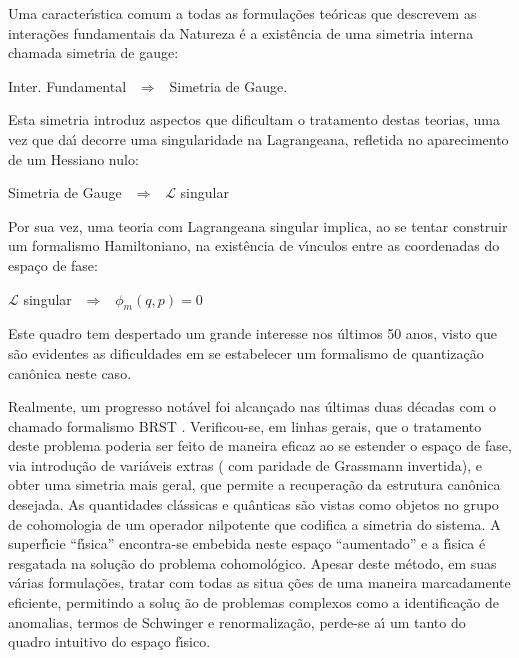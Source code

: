 \documentclass[a4paper,thmsa,12pt]{report}
\begin{document}
Uma caracter\'{\i}stica comum a todas as formula\c{c}\~{o}es te\'{o}ricas
que descrevem as intera\c{c}\~{o}es fundamentais da Natureza \'{e} a
exist\^{e}ncia de uma simetria interna chamada simetria de gauge:

\begin{center}
Inter. Fundamental $~~\Longrightarrow~~$ Simetria de Gauge.
\end{center}

\noindent Esta simetria introduz aspectos que dificultam o tratamento destas
teorias, uma vez que da\'{\i} decorre uma singularidade na Lagrangeana,
refletida no aparecimento de um Hessiano nulo:

\begin{center}
Simetria de Gauge $~~\Longrightarrow~~$ $\mathcal{L}$ singular
\end{center}

\noindent Por sua vez, uma teoria com Lagrangeana singular implica, ao se
tentar construir um formalismo Hamiltoniano, na exist\^{e}ncia de
v\'{\i}nculos entre as coordenadas do espa\c{c}o de fase:

\begin{center}
$\mathcal{L}$ singular $~~\Longrightarrow~~$ $\phi _{m}\left( q,p\right) =0$
\end{center}

\noindent Este quadro tem despertado um grande interesse nos \'{u}ltimos 50
anos, visto que s\~{a}o evidentes as dificuldades em se estabelecer um
formalismo de quantiza\c{c}\~{a}o can\^{o}nica neste caso.

Realmente, um progresso not\'{a}vel foi alcan\c{c}ado nas \'{u}ltimas duas
d\'{e}cadas com o chamado formalismo BRST \cite{teitelboim}. Verificou-se,
em linhas gerais, que o tratamento deste problema poderia ser feito de
maneira eficaz ao se estender o espa\c{c}o de fase, via introdu\c{c}\~{a}o
de vari\'{a}veis extras ( com paridade de Grassmann invertida), e obter uma
simetria mais geral, que permite a recupera\c{c}\~{a}o da estrutura
can\^{o}nica desejada. As quantidades cl\'{a}ssicas e qu\^{a}nticas s\~{a}o
vistas como objetos no grupo de cohomologia de um operador nilpotente que
codifica a simetria do sistema. A superf\'{\i}cie ``f\'{\i}sica''
encontra-se embebida neste espa\c{c}o ``aumentado'' e a f\'{\i}sica \'{e}
resgatada na solu\c{c}\~{a}o do problema cohomol\'{o}gico. Apesar deste
m\'{e}todo, em suas v\'{a}rias formula\c{c}\~{o}es, tratar com todas as situa%
\c{c}\~{o}es de uma maneira marcadamente eficiente, permitindo a solu\c{c}%
\~{a}o de problemas complexos como a identifica\c{c}\~{a}o de anomalias,
termos de Schwinger e renormaliza\c{c}\~{a}o, perde-se a\'{\i} um tanto do
quadro intuitivo do espa\c{c}o f\'{\i}sico.
\end{document}
